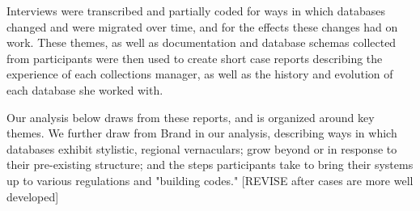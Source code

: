 Interviews were transcribed and partially coded for ways in which databases changed and were migrated over time, and for the effects these changes had on work. These themes, as well as documentation and database schemas collected from participants were then used to create short case reports describing the experience of each collections manager, as well as the history and evolution of each database she worked with.

Our analysis below draws from these reports, and is organized around key themes. We further draw from Brand in our analysis, describing ways in which databases exhibit stylistic, regional vernaculars; grow beyond or in response to their pre-existing structure; and the steps participants take to bring their systems up to various regulations and "building codes." [REVISE after cases are more well developed]